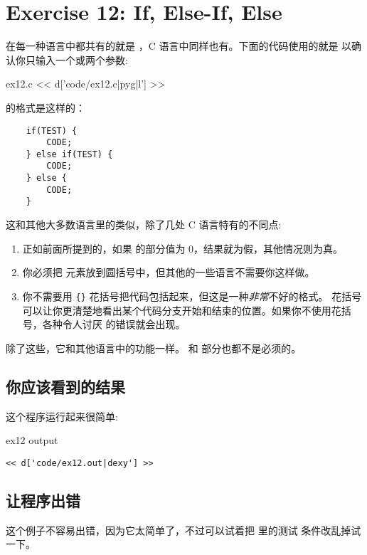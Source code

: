 \chapter{Exercise 12: If, Else-If, Else}

在每一种语言中都共有的就是 ，C 语言中同样也有。下面的代码使用的就是 
以确认你只输入一个或两个参数:

\begin{code}{ex12.c}
<< d['code/ex12.c|pyg|l'] >>
\end{code}

的格式是这样的：

\begin{Verbatim}
    if(TEST) {
        CODE;
    } else if(TEST) {
        CODE;
    } else {
        CODE;
    }
\end{Verbatim}

这和其他大多数语言里的类似，除了几处 C 语言特有的不同点:

\begin{enumerate}
\item 正如前面所提到的，如果  的部分值为 0，结果就为假，其他情况则为真。
\item 你必须把  元素放到圆括号中，但其他的一些语言不需要你这样做。
\item 你不需要用 \verb|{}| 花括号把代码包括起来，但这是一种\emph{非常}不好的格式。
花括号可以让你更清楚地看出某个代码分支开始和结束的位置。如果你不使用花括号，各种令人讨厌
的错误就会出现。
\end{enumerate}

除了这些，它和其他语言中的功能一样。 和  部分也都不是必须的。

\section{你应该看到的结果}

这个程序运行起来很简单:

\begin{code}{ex12 output}
\begin{lstlisting}
<< d['code/ex12.out|dexy'] >>
\end{lstlisting}
\end{code}

\section{让程序出错}
这个例子不容易出错，因为它太简单了，不过可以试着把  里的测试
条件改乱掉试一下。

